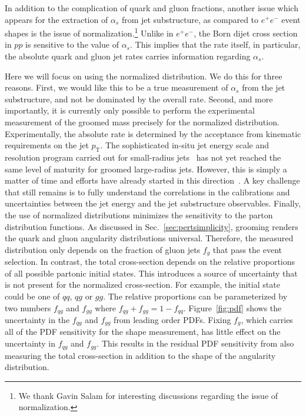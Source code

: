 In addition to the complication of quark and gluon fractions, another issue which appears for the extraction of $\alpha_s$ from jet substructure, as compared to $e^+e^-$ event shapes is the issue of normalization.\footnote{We thank Gavin Salam for interesting discussions regarding the issue of normalization.} Unlike in $e^+e^-$, the Born dijet cross section in $pp$ is sensitive to the value of $\alpha_s$. This implies that the rate itself, in particular, the absolute quark and gluon jet rates carries information regarding $\alpha_s$. 

Here we will focus on using the normalized distribution. We do this for three reasons. First, we would like this to be a true measurement of $\alpha_s$ from the jet substructure, and not be dominated by the overall rate. Second, and more importantly, it is currently only possible to perform the experimental measurement of the groomed mass precisely for the normalized distribution.  Experimentally, the absolute rate is determined by the acceptance from kinematic requirements on the jet $p_\text{T}$.  The sophisticated in-situ jet energy scale and resolution program carried out for small-radius jets~\cite{Aad:2014bia,Aaboud:2017jcu,Khachatryan:2016kdb,CMS-DP-2016-020} has not yet reached the same level of maturity for groomed large-radius jets.  However, this is simply a matter of time and efforts have already started in this direction~\cite{ATLAS-CONF-2017-063}.  A key challenge that still remains is to fully understand the correlations in the calibrations and uncertainties between the jet energy and the jet substructure observables.  Finally, the use of normalized distributions minimizes the sensitivity to the parton distribution functions.  As discussed in Sec.~\ref{sec:pertsimplicity}, grooming renders the quark and gluon angularity distributions universal.  Therefore, the measured distribution only depends on the fraction of gluon jets $f_g$ that pass the event selection.  In contrast, the total cross-section depends on the relative proportions of all possible partonic initial states.  This introduces a source of uncertainty that is not present for the normalized cross-section.  For example, the initial state could be one of $qq$, $qg$ or $gg$.  The relative proportions can be parameterized by two numbers $f_{qg}$ and $f_{gg}$ where $f_{qg}+f_{gg}=1-f_{qq}$.   Figure~\ref{fig:pdf} shows the uncertainty in the $f_{qg}$ and $f_{gg}$ from leading order PDFs.  Fixing $f_g$, which carries all of the PDF sensitivity for the shape measurement, has little effect on the uncertainty in $f_{qg}$ and $f_{gg}$.  This results in the residual PDF sensitivity from also measuring the total cross-section in addition to the shape of the angularity distribution.





